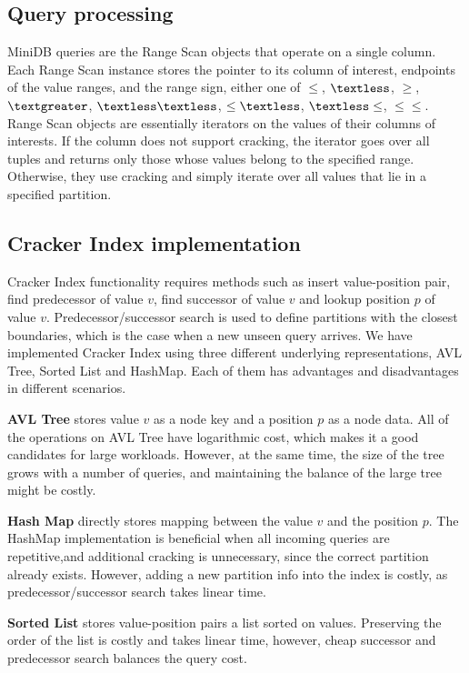 \subsection{Query processing}
MiniDB queries are the Range Scan objects that operate on a single column. Each Range Scan instance stores the pointer to its column of interest, endpoints of the value ranges, and the range sign, either one of $\leq$, $\textless$, $\geq$, $\textgreater$, $\textless \textless$, $\leq \textless$, $\textless \leq$, $\leq \leq$. Range Scan objects are essentially iterators on the values of their columns of interests. If the column does not support cracking, the iterator goes over all tuples and returns only those whose values belong to the specified range. Otherwise, they use cracking and simply iterate over all values that lie in a specified partition. 


\subsection{Cracker Index implementation}
Cracker Index functionality requires methods such as insert value-position pair, find predecessor of value $v$, find successor of value $v$ and lookup position $p$ of value $v$. Predecessor/successor search is used to define partitions with the closest boundaries, which is the case when a new unseen query arrives. We have implemented Cracker Index using three different underlying representations, AVL Tree, Sorted List and HashMap. Each of them has advantages and disadvantages in different scenarios.

\textbf{AVL Tree} stores value $v$ as a node key and a position $p$ as a node data. All of the operations on AVL Tree have logarithmic cost, which makes it a good candidates for large workloads. However, at the same time, the size of the tree grows with a number of queries, and maintaining the balance of the large tree might be costly.

\textbf{Hash Map} directly stores mapping between the value $v$ and the position $p$. The HashMap implementation is beneficial when all incoming queries are repetitive,and additional cracking is unnecessary, since the correct partition already exists. However, adding a new partition info into the index is costly, as predecessor/successor search takes linear time.

\textbf{Sorted List} stores value-position pairs a list sorted on values. Preserving the order of the list is costly and takes linear time, however, cheap successor and predecessor search balances the query cost.

